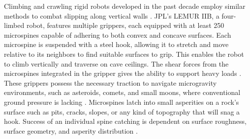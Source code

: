 Climbing and crawling rigid robots developed in the past decade employ similar methods to combat slipping along vertical walls \cite{asbeck_climbing_nodate, li_structure_2020, martone_enhancing_2019, ruotolo_load-sharing_2019, xu_rough_2016}. JPL's LEMUR IIB, a four-limbed robot, features multiple grippers, each equipped with at least 250 microspines capable of adhering to both convex and concave surfaces. Each microspine is suspended with a steel hook, allowing it to stretch and move relative to its neighbors to find suitable surfaces to grip. This enables the robot to climb vertically and traverse on cave ceilings. The shear forces from the microspines integrated in the gripper gives the ability to support heavy loads \cite{parness_gravity-independent_2013}. These grippers possess the necessary traction to navigate microgravity environments, such as asteroids, comets, and small moons, where conventional ground pressure is lacking \cite{parness_lemur_2017}. Microspines latch into small asperities on a rock’s surface such as pits, cracks, slopes, or any kind of topography that will snag a hook. Success of an individual spine catching is dependent on surface roughness, surface geometry, and asperity distribution \cite{parness_maturing_2017}. %


